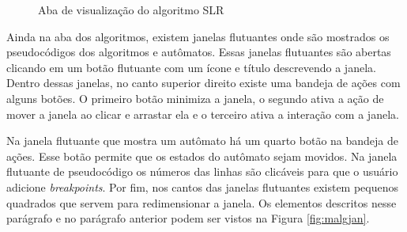 \begin{figure}[ht]
  \centering
  \captionsetup{width=16cm}
  \caption{Aba de visualização do algoritmo SLR}
  \label{fig:malg}
\end{figure}

Ainda na aba dos algoritmos, existem janelas flutuantes onde são mostrados os pseudocódigos dos algoritmos e autômatos. Essas janelas flutuantes são abertas clicando em um botão flutuante com um ícone e título descrevendo a janela. Dentro dessas janelas, no canto superior direito existe uma bandeja de ações com alguns botões. O primeiro botão minimiza a janela, o segundo ativa a ação de mover a janela ao clicar e arrastar ela e o terceiro ativa a interação com a janela.

Na janela flutuante que mostra um autômato há um quarto botão na bandeja de ações. Esse botão permite que os estados do autômato sejam movidos. Na janela flutuante de pseudocódigo os números das linhas são clicáveis para que o usuário adicione \textit{breakpoints}. Por fim, nos cantos das janelas flutuantes existem pequenos quadrados que servem para redimensionar a janela. Os elementos descritos nesse parágrafo e no parágrafo anterior podem ser vistos na Figura \ref{fig:malgjan}.


